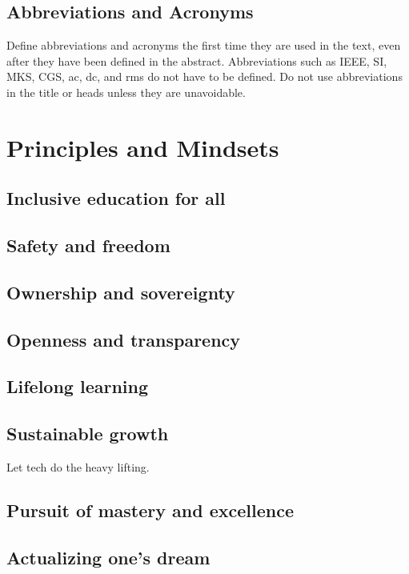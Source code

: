 \documentclass[journal, onecolumn]{IEEEtran}
\begin{document}
\subsection{Abbreviations and Acronyms}\label{AA}
Define abbreviations and acronyms the first time they are used in the text, 
even after they have been defined in the abstract. Abbreviations such as 
IEEE, SI, MKS, CGS, ac, dc, and rms do not have to be defined. Do not use 
abbreviations in the title or heads unless they are unavoidable.

\section{Principles and Mindsets}
\label{sec:principles_mindsets}

\subsection{Inclusive education for all}

\subsection{Safety and freedom}

\subsection{Ownership and sovereignty}

\subsection{Openness and transparency}

\subsection{Lifelong learning}

\subsection{Sustainable growth}

Let tech do the heavy lifting.

\subsection{Pursuit of mastery and excellence}

\subsection{Actualizing one's dream}
\end{document}
